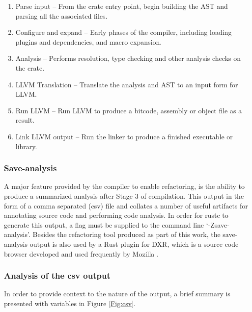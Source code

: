 \begin{enumerate}
\item Parse input -- From the crate entry point, begin building the AST and parsing all the associated files.
\item Configure and expand -- Early phases of the compiler, including loading plugins and dependencies, and macro expansion.
\item Analysis -- Performs resolution, type checking and other analysis checks on the crate.
\item LLVM Translation -- Translate the analysis and AST to an input form for LLVM.
\item Run LLVM -- Run LLVM to produce a bitcode, assembly or object file as a result.
\item Link LLVM output -- Run the linker to produce a finished executable or library.
\end{enumerate}

\subsubsection{Save-analysis}
A major feature provided by the compiler to enable refactoring, is the ability to produce a summarized analysis after Stage 3 of compilation. This output in the form of a comma separated (csv) file and collates a number of useful artifacts for annotating source code and performing code analysis. In order for rustc to generate this output, a flag must be supplied to the command line `-Zsave-analysis'. Besides the refactoring tool produced as part of this work, the save-analysis output is also used by a Rust plugin for DXR, which is a source code browser developed and used frequently by Mozilla \cite{dxr15}.  


\subsubsection{Analysis of the csv output}
In order to provide context to the nature of the output, a brief summary is presented with variables in Figure \ref{Fig:csv}.

